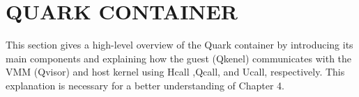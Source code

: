


\section{QUARK CONTAINER}
This section gives a high-level overview of the Quark container\cite*{quark} by introducing its main components and explaining how the guest (Qkenel) communicates with the 
VMM (Qvisor) and host kernel using Hcall ,Qcall, and Ucall, respectively. This explanation is necessary for a better understanding of Chapter 4.

